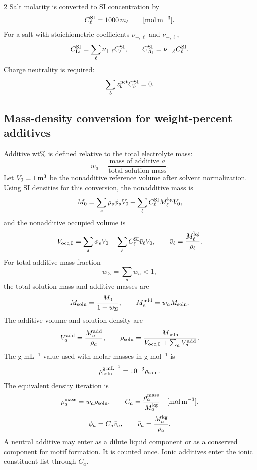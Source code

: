 \documentclass[10pt]{article}
\newcommand{\molm}{\mathrm{mol\,m^{-3}}}
\begin{document}
\begin{multicols}{2}
Salt molarity is converted to SI concentration by
\[
C_\ell^{\rm SI}=1000\,m_\ell
\qquad[\molm].
\]
For a salt with stoichiometric coefficients \(\nu_{+,\ell}\) and
\(\nu_{-,\ell}\),
\[
C_{\rm Li}^{\rm SI}
=
\sum_\ell \nu_{+,\ell}C_\ell^{\rm SI},
\qquad
C_{A_\ell}^{\rm SI}
=
\nu_{-,\ell}C_\ell^{\rm SI}.
\]
Charge neutrality is required:
\[
\sum_b z_b^{\rm net}C_b^{\rm SI}=0.
\]

\subsection{Mass-density conversion for weight-percent additives}

Additive wt\% is defined relative to the total electrolyte mass:
\[
w_a
=
\frac{\text{mass of additive }a}{\text{total solution mass}}.
\]
Let \(V_0=1\,{\rm m^3}\) be the nonadditive reference volume after solvent
normalization. Using SI densities for this conversion, the nonadditive mass is
\[
M_0
=
\sum_s \rho_s\phi_s V_0
+
\sum_\ell C_\ell^{\rm SI}M_\ell^{\rm kg}V_0,
\]
and the nonadditive occupied volume is
\[
V_{\rm occ,0}
=
\sum_s\phi_sV_0
+
\sum_\ell C_\ell^{\rm SI}\bar v_\ell V_0,
\qquad
\bar v_\ell=\frac{M_\ell^{\rm kg}}{\rho_\ell}.
\]
For total additive mass fraction
\[
w_\Sigma=\sum_a w_a<1,
\]
the total solution mass and additive masses are
\[
M_{\rm soln}
=
\frac{M_0}{1-w_\Sigma},
\qquad
M_a^{\rm add}=w_aM_{\rm soln}.
\]
The additive volume and solution density are
\[
V_a^{\rm add}
=
\frac{M_a^{\rm add}}{\rho_a},
\qquad
\rho_{\rm soln}
=
\frac{M_{\rm soln}}
{V_{\rm occ,0}+\sum_aV_a^{\rm add}}.
\]
The g mL\(^{-1}\) value used with molar masses in g mol\(^{-1}\) is
\[
\rho_{\rm soln}^{\rm g\,mL^{-1}}
=
10^{-3}\rho_{\rm soln}.
\]
The equivalent density iteration is
\[
\rho_a^{\rm mass}
=
w_a\rho_{\rm soln},
\qquad
C_a
=
\frac{\rho_a^{\rm mass}}{M_a^{\rm kg}}
\quad[\molm],
\]
\[
\phi_a
=
C_a\bar v_a,
\qquad
\bar v_a=\frac{M_a^{\rm kg}}{\rho_a}.
\]
A neutral additive may enter as a dilute liquid component or as a conserved
component for motif formation. It is counted once. Ionic additives enter the
ionic constituent list through \(C_a\).


\end{multicols}
\end{document}
